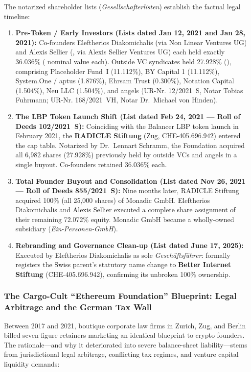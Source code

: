 \documentclass[a4paper,11pt,twoside,parskip=half-,headings=small]{scrartcl}
\begin{document}
The notarized shareholder lists (\emph{Gesellschafterlisten}) establish the factual legal timeline:
\begin{enumerate}[nosep]
  \item \textbf{Pre-Token / Early Investors (Lists dated Jan 12, 2021 and Jan 28, 2021):} Co-founders Eleftherios Diakomichalis (via Non Linear Ventures UG) and Alexis Sellier (, via Alexis Sellier Ventures UG) each held exactly 36.036\% ( nominal value each). Outside VC syndicates held 27.928\% (), comprising Placeholder Fund~I (11.112\%), BY Capital 1 (11.112\%), System.One / aptus (1.876\%), Ehrsam Trust (0.300\%), Notation Capital (1.504\%), Neu LLC (1.504\%), and angels (UR-Nr. 12/2021~S, Notar Tobias Fuhrmann; UR-Nr. 168/2021~VH, Notar Dr.~Michael von Hinden).
  \item \textbf{The LBP Token Launch Shift (List dated Feb 24, 2021 --- Roll of Deeds 102/2021~S):} Coinciding with the Balancer LBP token launch in February 2021, the \textbf{RADICLE Stiftung} (Zug, CHE-405.696.942) entered the cap table. Notarized by Dr.~Lennart Schramm, the Foundation acquired all 6,982 shares (27.928\%) previously held by outside VCs and angels in a single buyout. Co-founders retained 36.036\% each.
  \item \textbf{Total Founder Buyout and Consolidation (List dated Nov 26, 2021 --- Roll of Deeds 855/2021~S):} Nine months later, RADICLE Stiftung acquired 100\% (all 25,000 shares) of Monadic GmbH. Eleftherios Diakomichalis and Alexis Sellier executed a complete share assignment of their remaining 72.072\% equity. Monadic GmbH became a wholly-owned subsidiary (\emph{Ein-Personen-GmbH}).
  \item \textbf{Rebranding and Governance Clean-up (List dated June 17, 2025):} Executed by Eleftherios Diakomichalis as sole \emph{Gesch{\"a}ftsf{\"u}hrer}: formally registers the Swiss parent's statutory name change to \textbf{Better Internet Stiftung} (CHE-405.696.942), confirming its unbroken 100\% ownership.
\end{enumerate}

\clearpage

\subsubsection{The Cargo-Cult ``Ethereum Foundation'' Blueprint: Legal Arbitrage and the German Tax Wall}
\label{sec:cargo_cult_blueprint}

Between 2017 and 2021, boutique corporate law firms in Zurich, Zug, and Berlin billed seven-figure retainers marketing an identical blueprint to crypto founders. The rationale---and why it deteriorated into severe balance-sheet liability---stems from jurisdictional legal arbitrage, conflicting tax regimes, and venture capital liquidity demands:
\end{document}
